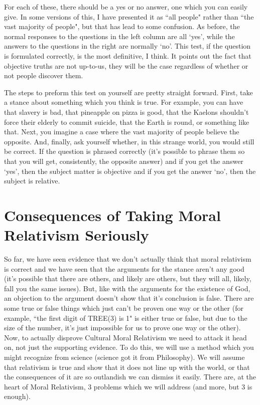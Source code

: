 For each of these, there should be a yes or no answer, one which you can easily give. In some versions of this, I have presented it as ``all people" rather than ``the vast majority of people", but that has lead to some confusion. As before, the normal responses to the questions in the left column are all `yes', while the answers to the questions in the right are normally `no'. This test, if the question is formulated correctly, is the most definitive, I think. It points out the fact that objective truths are not up-to-us, they will be the case regardless of whether or not people discover them. 

The steps to preform this test on yourself are pretty straight forward. First, take a stance about something which you think is true. For example, you can have that slavery is bad, that pineapple on pizza is good, that the Kaelons shouldn't force their elderly to commit suicide, that the Earth is round, or something like that. Next, you imagine a case where the vast majority of people believe the opposite. And, finally, ask yourself whether, in this strange world, you would still be correct.  If the question is phrased correctly (it's possible to phrase them so that you will get, consistently, the opposite answer) and if you get the answer `yes', then the subject matter is objective and if you get the answer `no', then the subject is relative.

\section{Consequences of Taking Moral Relativism Seriously}

So far, we have seen evidence that we don't actually think that moral relativism is correct and we have seen that the arguments for the stance aren't any good (it's possible that there are others, and likely are others, but they will all, likely, fall you the same issues). But, like with the arguments for the existence of God, an objection to the argument doesn't show that it's conclusion is false. There are some true or false things which just can't be proven one way or the other (for example, ``the first digit of TREE(3) is 1" is either true or  false, but due to the size of the number, it's just impossible for us to prove one way or the other). Now, to actually disprove Cultural Moral Relativism we need to attack it head on, not just the supporting evidence. To do this, we will use a method which you might recognize from science (science got it from Philosophy). We will assume that relativism is true and show that it does not line up with the world, or that the consequences of it are so outlandish we can dismiss it easily. There are, at the heart of Moral Relativism, 3 problems which we will address (and more, but 3 is enough). 

